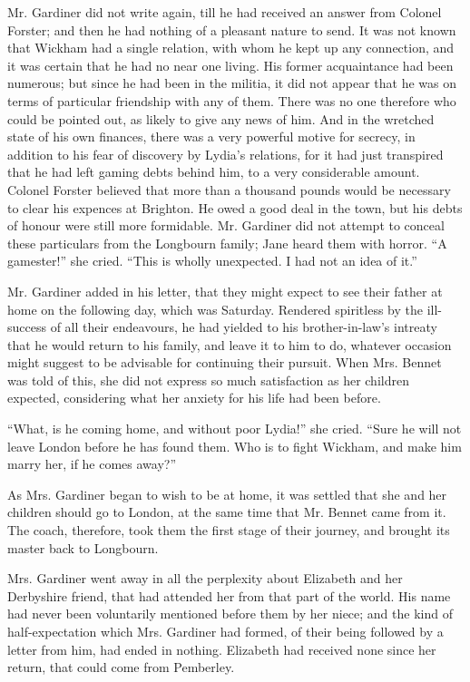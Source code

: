 Mr. Gardiner did not write again, till he had received
an answer from Colonel Forster; and then he had nothing
of a pleasant nature to send. It was not known that
Wickham had a single relation, with whom he kept up
any connection, and it was certain that he had no near
one living. His former acquaintance had been numerous;
but since he had been in the militia, it did not appear that
he was on terms of particular friendship with any of them.
There was no one therefore who could be pointed out, as
likely to give any news of him. And in the wretched state
of his own finances, there was a very powerful motive for
secrecy, in addition to his fear of discovery by Lydia’s
relations, for it had just transpired that he had left gaming
debts behind him, to a very considerable amount. Colonel
Forster believed that more than a thousand pounds would
be necessary to clear his expences at Brighton. He owed
a good deal in the town, but his debts of honour were still
more formidable. Mr. Gardiner did not attempt to conceal
these particulars from the Longbourn family; Jane heard
them with horror. “A gamester!” she cried. “This is
wholly unexpected. I had not an idea of it.”

Mr. Gardiner added in his letter, that they might expect
to see their father at home on the following day, which was
Saturday. Rendered spiritless by the ill-success of all
their endeavours, he had yielded to his brother-in-law’s
intreaty that he would return to his family, and leave it
to him to do, whatever occasion might suggest to be
advisable for continuing their pursuit. When Mrs. Bennet
was told of this, she did not express so much satisfaction
as her children expected, considering what her anxiety
for his life had been before.

“What, is he coming home, and without poor Lydia!”
she cried. “Sure he will not leave London before he has
found them. Who is to fight Wickham, and make him
marry her, if he comes away?”

As Mrs. Gardiner began to wish to be at home, it was
settled that she and her children should go to London,
at the same time that Mr. Bennet came from it. The
coach, therefore, took them the first stage of their journey,
and brought its master back to Longbourn.

Mrs. Gardiner went away in all the perplexity about
Elizabeth and her Derbyshire friend, that had attended
her from that part of the world. His name had never
been voluntarily mentioned before them by her niece;
and the kind of half-expectation which Mrs. Gardiner had
formed, of their being followed by a letter from him,
had ended in nothing. Elizabeth had received none since
her return, that could come from Pemberley.

